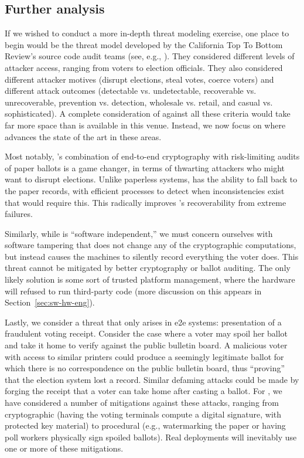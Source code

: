 \subsection{Further analysis}

If we wished to conduct a more in-depth threat modeling exercise, one place to begin would be
the threat model developed by the California Top To Bottom Review's source code audit teams (see, e.g., \cite{ca-hart-src07}). They considered different levels of attacker access, ranging from voters to election officials. They also considered different attacker motives (disrupt elections, steal votes, coerce voters) and different attack outcomes (detectable vs. undetectable, recoverable vs. unrecoverable, prevention vs. detection, wholesale vs. retail, and casual vs. sophisticated). A complete consideration of \projname against all these criteria would take far more space than is available in this venue. Instead, we now focus on where \projname advances the state of the art in these areas.

Most notably, \projname's combination of end-to-end cryptography with risk-limiting audits of paper ballots is a game changer, in terms of thwarting attackers who might want to disrupt elections. Unlike paperless systems, \projname has the ability to fall back to the paper records, with efficient processes to detect when inconsistencies exist that would require this. This radically improves \projname's recoverability from extreme failures.

Similarly, while \projname is ``software independent,'' we must concern ourselves with software tampering that does not change any of the cryptographic computations, but instead causes the \projname machines to silently record everything the voter does. This threat cannot be mitigated by better cryptography or ballot auditing. The only likely solution is some sort of trusted platform management, where the hardware will refused to run third-party code (more discussion on this appears in Section~\ref{sec:sw-hw-eng}).

Lastly, we consider a threat that only arises in e2e systems: presentation of a fraudulent voting receipt. Consider the case where a voter may spoil her ballot and take it home to verify against the public bulletin board. A malicious voter with access to similar printers could produce a seemingly legitimate ballot for which there is no correspondence on the public bulletin board, thus ``proving'' that the election system lost a record. Similar defaming attacks could be made by forging the receipt that a voter can take home after casting a ballot. For \projname, we have considered a number of mitigations against these attacks, ranging from cryptographic (having the voting terminals compute a digital signature, with protected key material) to procedural (e.g., watermarking the paper or having poll workers physically sign spoiled ballots). Real \projname deployments will inevitably use one or more of these mitigations.

